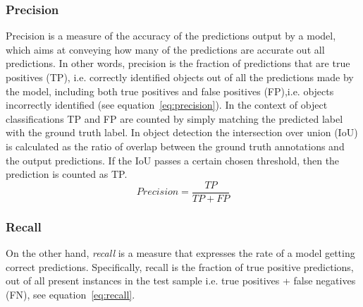 \subsubsection{Precision}
Precision is a measure of the accuracy of the predictions output by a model, which aims at conveying how many of the predictions are accurate out all predictions. 
%
In other words, precision is the fraction of predictions that are true positives (TP), i.e. correctly identified objects out of all the predictions made by the model, including both true positives and false positives (FP),i.e. objects incorrectly identified (see equation~\ref{eq:precision}).
%
In the context of object classifications TP and FP are counted by simply matching the predicted label with the ground truth label. 
%
In object detection the intersection over union (IoU) is calculated as the ratio of overlap between the ground truth annotations and the output predictions. If the IoU passes a certain chosen threshold, then the prediction is counted as TP. 
\begin{equation}
  Precision =   \frac{TP}{TP+FP}
  \label{eq:precision}
\end{equation}




\subsubsection{Recall} On the other hand, \textit{recall} is a measure that expresses the rate of a model getting correct predictions.
Specifically, recall is the fraction of true positive predictions, out of all present instances in the test sample  i.e. true positives + false negatives (FN), see equation~\ref{eq:recall}.

